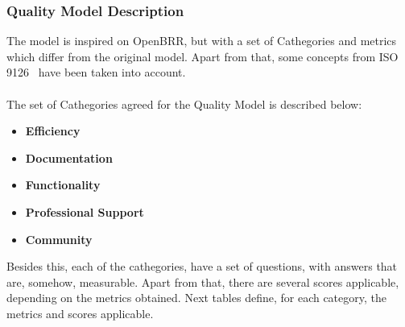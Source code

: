 \documentclass[11pt]{article}
\begin{document}
\subsubsection{Quality Model Description}
The model is inspired on OpenBRR, but with a set of Cathegories and metrics which differ from the original model. Apart from that, some concepts from ISO 9126~\cite{ISO00, ISO01} have been taken into account.\\
\\
The set of Cathegories agreed for the Quality Model is described below:
\begin{itemize}\itemsep0pt
\item{\textbf{Efficiency}}
\item{\textbf{Documentation}}
\item{\textbf{Functionality}}
\item{\textbf{Professional Support}}
\item{\textbf{Community}}
\end{itemize}

Besides this, each of the cathegories, have a set of questions, with answers that are, somehow, measurable. Apart from that, there are several scores applicable, depending on the metrics obtained. Next tables define, for each category, the metrics and scores applicable.
\end{document}
